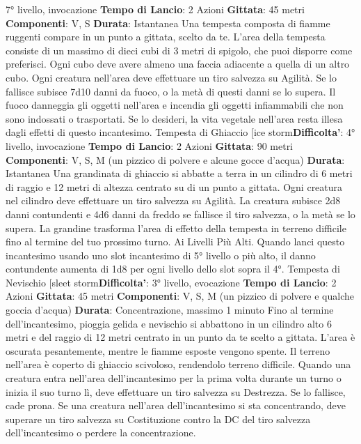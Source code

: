 \begin{multicols}{2}
7° livello, invocazione
\textbf{Tempo di Lancio}: 2 Azioni
\textbf{Gittata}: 45 metri
\textbf{Componenti}: V, S
\textbf{Durata}: Istantanea
Una tempesta composta di fiamme ruggenti compare in
un punto a gittata, scelto da te. L’area della tempesta
consiste di un massimo di dieci cubi di 3 metri di
spigolo, che puoi disporre come preferisci. Ogni cubo
deve avere almeno una faccia adiacente a quella di un
altro cubo. Ogni creatura nell’area deve effettuare un
tiro salvezza su Agilità. Se lo fallisce subisce 7d10
danni da fuoco, o la metà di questi danni se lo supera.
Il fuoco danneggia gli oggetti nell’area e incendia gli
oggetti infiammabili che non sono indossati o
trasportati. Se lo desideri, la vita vegetale nell’area
resta illesa dagli effetti di questo incantesimo.
Tempesta di Ghiaccio
[ice storm\textbf{Difficolta'}:
4° livello, invocazione
\textbf{Tempo di Lancio}: 2 Azioni
\textbf{Gittata}: 90 metri
\textbf{Componenti}: V, S, M (un pizzico di polvere e alcune
gocce d’acqua)
\textbf{Durata}: Istantanea
Una grandinata di ghiaccio si abbatte a terra in un
cilindro di 6 metri di raggio e 12 metri di altezza centrato
su di un punto a gittata. Ogni creatura nel cilindro deve
effettuare un tiro salvezza su Agilità. La creatura
subisce 2d8 danni contundenti e 4d6 danni da freddo
se fallisce il tiro salvezza, o la metà se lo supera.
La grandine trasforma l’area di effetto della tempesta in
terreno difficile fino al termine del tuo prossimo turno.
Ai Livelli Più Alti. Quando lanci questo incantesimo
usando uno slot incantesimo di 5° livello o più alto, il
danno contundente aumenta di 1d8 per ogni livello dello
slot sopra il 4°.
Tempesta di Nevischio
[sleet storm\textbf{Difficolta'}:
3° livello, evocazione
\textbf{Tempo di Lancio}: 2 Azioni
\textbf{Gittata}: 45 metri
\textbf{Componenti}: V, S, M (un pizzico di polvere e qualche
goccia d’acqua)
\textbf{Durata}: Concentrazione, massimo 1 minuto
Fino al termine dell’incantesimo, pioggia gelida e
nevischio si abbattono in un cilindro alto 6 metri e del
raggio di 12 metri centrato in un punto da te scelto a
gittata. L’area è oscurata pesantemente, mentre le
fiamme esposte vengono spente.
Il terreno nell’area è coperto di ghiaccio scivoloso,
rendendolo terreno difficile. Quando una creatura entra
nell’area dell’incantesimo per la prima volta durante un
turno o inizia il suo turno lì, deve effettuare un tiro
salvezza su Destrezza. Se lo fallisce, cade prona.
Se una creatura nell’area dell’incantesimo si sta
concentrando, deve superare un tiro salvezza su
Costituzione contro la DC del tiro salvezza
dell’incantesimo o perdere la concentrazione.

\end{multicols}
